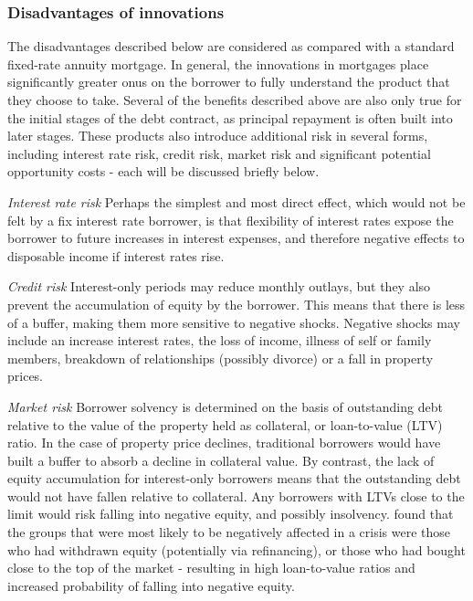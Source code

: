 \documentclass[
]{book}
\begin{document}
\hypertarget{disadvantages-of-innovations}{%
\subsubsection{Disadvantages of innovations}\label{disadvantages-of-innovations}}

The disadvantages described below are considered as compared with a standard fixed-rate annuity mortgage. In general, the innovations in mortgages place significantly greater onus on the borrower to fully understand the product that they choose to take. Several of the benefits described above are also only true for the initial stages of the debt contract, as principal repayment is often built into later stages. These products also introduce additional risk in several forms, including interest rate risk, credit risk, market risk and significant potential opportunity costs - each will be discussed briefly below.

\emph{Interest rate risk}\newline
Perhaps the simplest and most direct effect, which would not be felt by a fix interest rate borrower, is that flexibility of interest rates expose the borrower to future increases in interest expenses, and therefore negative effects to disposable income if interest rates rise.

\emph{Credit risk}\newline
Interest-only periods may reduce monthly outlays, but they also prevent the accumulation of equity by the borrower. This means that there is less of a buffer, making them more sensitive to negative shocks. Negative shocks may include an increase interest rates, the loss of income, illness of self or family members, breakdown of relationships (possibly divorce) or a fall in property prices.

\emph{Market risk}\newline
Borrower solvency is determined on the basis of outstanding debt relative to the value of the property held as collateral, or loan-to-value (LTV) ratio. In the case of property price declines, traditional borrowers would have built a buffer to absorb a decline in collateral value. By contrast, the lack of equity accumulation for interest-only borrowers means that the outstanding debt would not have fallen relative to collateral. Any borrowers with LTVs close to the limit would risk falling into negative equity, and possibly insolvency. \citet{scanlon2011} found that the groups that were most likely to be negatively affected in a crisis were those who had withdrawn equity (potentially via refinancing), or those who had bought close to the top of the market - resulting in high loan-to-value ratios and increased probability of falling into negative equity.
\end{document}
